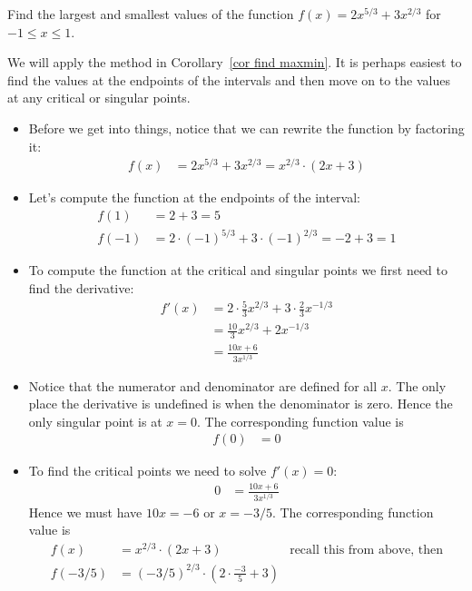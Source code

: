 \begin{eg}\label{APPglobalMaxMinA}
Find the largest and smallest values of the function $f(x)=2x^{5/3}+3x^{2/3}$ for $-1\le
x\le 1$.

\soln We will apply the method in Corollary~\ref{cor find maxmin}. It is perhaps easiest
to find the values at the endpoints of the intervals and then move on to the values at
any critical or singular points.
\begin{itemize}
 \item Before we get into things, notice that we can rewrite the function by factoring
it:
\begin{align*}
  f(x) &= 2x^{5/3}+3x^{2/3} = x^{2/3} \cdot \left(2x + 3\right)
\end{align*}
 \item Let's compute the function at the endpoints of the interval:
\begin{align*}
  f(1) &= 2 +3 = 5 \\
  f(-1) &= 2 \cdot(-1)^{5/3} + 3\cdot (-1)^{2/3} =-2 + 3 = 1
\end{align*}
\item To compute the function at the critical and singular points we first need to find
the derivative:
\begin{align*}
  f'(x) &= 2 \cdot \frac{5}{3} x^{2/3} + 3 \cdot \frac{2}{3} x^{-1/3} \\
  &= \frac{10}{3} x^{2/3} + 2 x^{-1/3}\\
  &= \frac{10 x + 6}{3 x^{1/3}}
\end{align*}
\item Notice that the numerator and denominator are defined for all $x$. The only place
the derivative is undefined is when the denominator is zero. Hence the only singular
point is at $x=0$. The corresponding function value is
\begin{align*}
  f(0) &= 0
\end{align*}
\item To find the critical points we need to solve $f'(x) = 0$:
\begin{align*}
  0 &= \frac{10 x + 6}{3 x^{1/3}}
\end{align*}
Hence we must have $10x=-6$ or $x=-3/5$. The corresponding function value is
\begin{align*}
  f(x) &= x^{2/3} \cdot \left(2x + 3\right) & \text{recall this from above, then}\\
  f(-3/5) &= (-3/5)^{2/3} \cdot\left(2 \cdot \frac{-3}{5} + 3 \right) \\

\end{align*}
\end{itemize}
\end{eg}
